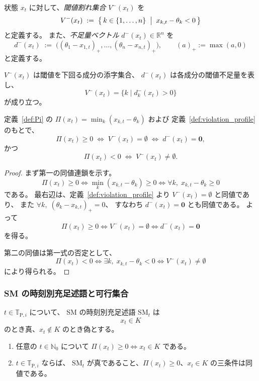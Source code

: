 \begin{definition}
\label{def:violation_profile}
状態 $x_t$ に対して、\emph{閾値割れ集合} $V^-(x_t)$ を
\[
  V^-(x_t)\;:=\;\bigl\{\,k\in\{1,\ldots,n\}\;\bigm|\;x_{k,t}-\theta_k<0\,\bigr\}
\]
と定義する。
また、\emph{不足量ベクトル} $d^-(x_t)\in\mathbb{R}^n$ を
\[
  d^-(x_t)\;:=\;\bigl((\theta_1-x_{1,t})_+,\ldots,(\theta_n-x_{n,t})_+\bigr),\qquad (a)_+:=\max(a,0)
\]
と定義する。

$V^-(x_t)$ は閾値を下回る成分の添字集合、
$d^-(x_t)$ は各成分の閾値不足量を表し、
\[
  V^-(x_t)
  =
  \bigl\{
    k
    \mid
    d^-_k(x_t)>0
  \bigr\}
\]
が成り立つ。
\end{definition}

\begin{proposition}[$\Pi$ と閾値割れ集合の関係]
\label{prop:pi_violation_profile}
定義~\ref{def:Pi} の $\Pi(x_t)=\min_k(x_{k,t}-\theta_k)$ および
定義~\ref{def:violation_profile} のもとで、
\[
  \Pi(x_t)\ge0\;\iff\;V^-(x_t)=\emptyset\;\iff\;d^-(x_t)=\mathbf{0},
\]
かつ
\[
  \Pi(x_t)<0\;\iff\;V^-(x_t)\neq\emptyset.
\]
\end{proposition}

\begin{proof}
まず第一の同値連鎖を示す。
\[
  \Pi(x_t)\ge0
  \iff
  \min_k(x_{k,t}-\theta_k)\ge0
  \iff
  \forall k,\;
  x_{k,t}-\theta_k\ge0
\]
である。
最右辺は、定義~\ref{def:violation_profile} より
$V^-(x_t)=\emptyset$ と同値であり、
また $\forall k,\; (\theta_k-x_{k,t})_+=0$、
すなわち $d^-(x_t)=\mathbf{0}$ とも同値である。
よって
\[
  \Pi(x_t)\ge0
  \iff
  V^-(x_t)=\emptyset
  \iff
  d^-(x_t)=\mathbf{0}
\]
を得る。

第二の同値は第一式の否定として、
\[
  \Pi(x_t)<0
  \iff
  \exists k,\;
  x_{k,t}-\theta_k<0
  \iff
  V^-(x_t)\neq\emptyset
\]
により得られる。
\end{proof}


\subsubsection{SM の時刻別充足述語と可行集合}

\begin{definition}[SM の時刻別充足述語]
\label{def:SM}
$t\in\mathbb{T}_{\mathrm{P},i}$ について、
SM の時刻別充足述語 $\mathrm{SM}_t$ は
\[
  x_t\in K
\]
のとき真、$x_t\notin K$ のとき偽とする。
\end{definition}

\begin{proposition}[SM と可行集合の同値性]
\label{prop:sm_K_equiv}
\begin{enumerate}[label=(\roman*)]
  \item 任意の $t\in\mathbb{N}_0$ について
  $\Pi(x_t)\ge0 \iff x_t\in K$ である。
  \item $t\in\mathbb{T}_{\mathrm{P},i}$ ならば、
  $\mathrm{SM}_t$ が真であること、$\Pi(x_t)\ge0$、$x_t\in K$ の三条件は同値である。
\end{enumerate}
\end{proposition}

